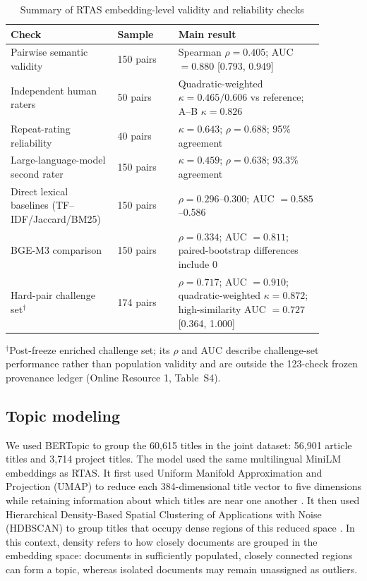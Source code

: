 \documentclass[pdflatex,sn-apa]{sn-jnl}
\begin{document}
\begin{table}[htbp]
\centering
\caption{Summary of RTAS embedding-level validity and reliability checks}
\label{tab:validity}
\begin{tabular}{p{0.27\linewidth}p{0.18\linewidth}p{0.43\linewidth}}
\toprule
Check & Sample & Main result\\
\midrule
Pairwise semantic validity & 150 pairs & Spearman $\rho=0.405$; AUC $=0.880$ [0.793, 0.949]\\
Independent human raters & 50 pairs & Quadratic-weighted $\kappa=0.465/0.606$ vs reference; A--B $\kappa=0.826$\\
Repeat-rating reliability & 40 pairs & $\kappa=0.643$; $\rho=0.688$; 95\% agreement\\
Large-language-model second rater & 150 pairs & $\kappa=0.459$; $\rho=0.638$; 93.3\% agreement\\
Direct lexical baselines (TF--IDF/Jaccard/BM25) & 150 pairs & $\rho=0.296$--0.300; AUC $=0.585$--0.586\\
BGE-M3 comparison & 150 pairs & $\rho=0.334$; AUC $=0.811$; paired-bootstrap differences include 0\\
\midrule
Hard-pair challenge set$^{\dagger}$ & 174 pairs & $\rho=0.717$; AUC $=0.910$; quadratic-weighted $\kappa=0.872$; high-similarity AUC $=0.727$ [0.364, 1.000]\\
\bottomrule
\end{tabular}

\vspace{1mm}
\footnotesize $^{\dagger}$Post-freeze enriched challenge set; its $\rho$ and AUC describe challenge-set performance rather than population validity and are outside the 123-check frozen provenance ledger (Online Resource 1, Table~S4).
\end{table}

\subsection{Topic modeling}

We used BERTopic \citep{grootendorst2022bertopic} to group the 60,615 titles in the joint dataset: 56,901 article titles and 3,714 project titles. The model used the same multilingual MiniLM embeddings as RTAS. It first used Uniform Manifold Approximation and Projection (UMAP) to reduce each 384-dimensional title vector to five dimensions while retaining information about which titles are near one another \citep{mcinnes2018umap}. It then used Hierarchical Density-Based Spatial Clustering of Applications with Noise (HDBSCAN) to group titles that occupy dense regions of this reduced space \citep{mcinnes2017hdbscan}. In this context, density refers to how closely documents are grouped in the embedding space: documents in sufficiently populated, closely connected regions can form a topic, whereas isolated documents may remain unassigned as outliers.
\end{document}
